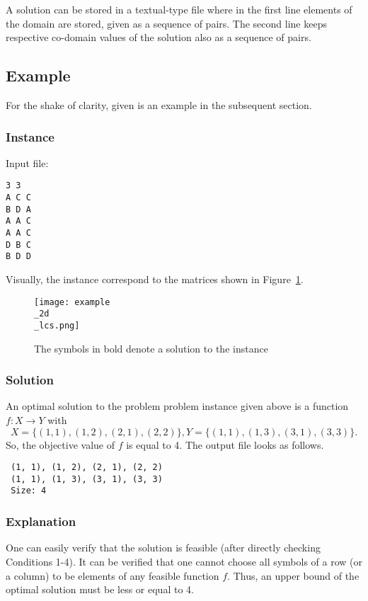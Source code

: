 \documentclass[]{article}
\begin{document}
A solution can be stored in a textual-type file where  in the first line elements of the domain are stored, given as a sequence of pairs.  The second line keeps respective co-domain values of the solution also as a sequence of pairs. 

\subsection{Example}
For the shake of clarity, given is an example in the subsequent section. 

\subsubsection{Instance}

Input file: 
\begin{verbatim}
3 3
A C C
B D A 
A A C
A A C
D B C
B D D
\end{verbatim}
Visually, the instance correspond to the matrices shown in Figure~\ref{fig:instance}. 

\begin{figure}[ht]
	\centering
	\texttt{[image: example\\\_2d\\\_lcs.png]}
	\caption{The symbols in bold denote a solution to the instance\protect\footnotemark }
	\label{fig:instance}
\end{figure}


  

\subsubsection{Solution}

An optimal solution to the problem problem instance given above is a function $f:X \rightarrow Y$ with 
$$X=\{ (1, 1), (1, 2), (2, 1), (2, 2)   \}, Y=\{ (1, 1), (1, 3), (3, 1), (3, 3) \}.$$
So, the objective value of $f$ is equal to 4.  The output file  looks as follows.

\begin{verbatim}
 (1, 1), (1, 2), (2, 1), (2, 2)
 (1, 1), (1, 3), (3, 1), (3, 3)
 Size: 4
\end{verbatim}


\subsubsection{Explanation}
 One can easily verify that the solution is feasible (after directly checking Conditions 1-4). It can be verified that one cannot choose all symbols of a row (or a column) to be elements of any feasible function $f$.  Thus, an upper bound of the optimal solution must be less or equal to 4. 
\end{document}
